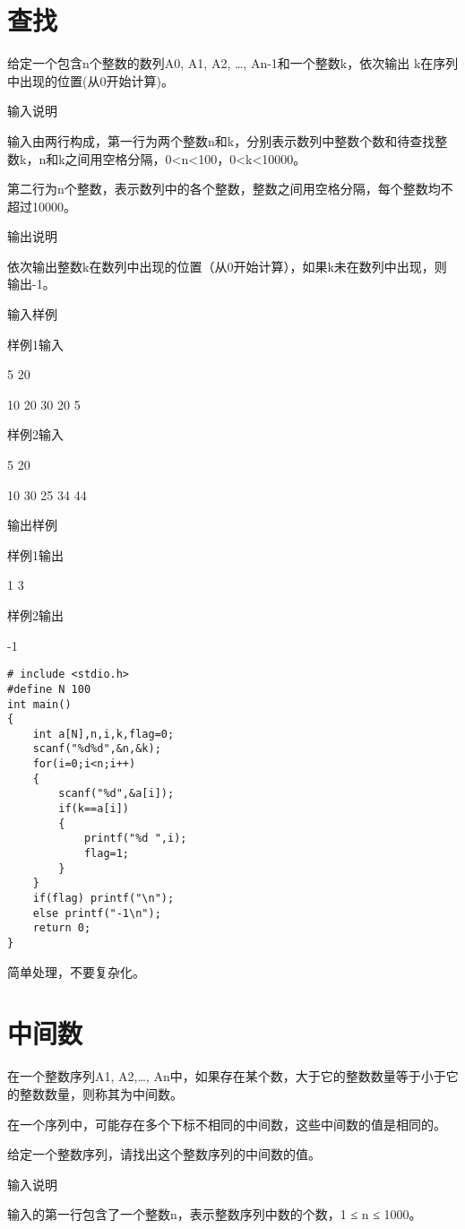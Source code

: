 \section{查找}	
给定一个包含n个整数的数列A0, A1, A2, \dots, An-1和一个整数k，依次输出 k在序列中出现的位置(从0开始计算)。

输入说明	

输入由两行构成，第一行为两个整数n和k，分别表示数列中整数个数和待查找整数k，n和k之间用空格分隔，0<n<100，0<k<10000。

第二行为n个整数，表示数列中的各个整数，整数之间用空格分隔，每个整数均不超过10000。

输出说明	

依次输出整数k在数列中出现的位置（从0开始计算），如果k未在数列中出现，则输出-1。

输入样例

样例1输入
	
5 20

10 20 30 20 5

样例2输入

5 20

10 30 25 34 44

输出样例
	
样例1输出

1 3

样例2输出

-1

\begin{lstlisting}
# include <stdio.h>
#define N 100
int main()
{
	int a[N],n,i,k,flag=0;
	scanf("%d%d",&n,&k);
	for(i=0;i<n;i++)
	{
		scanf("%d",&a[i]);
		if(k==a[i]) 
		{
			printf("%d ",i);
			flag=1;
		}
	} 
	if(flag) printf("\n");
	else printf("-1\n");
	return 0;
}
\end{lstlisting}

\begin{note}[要点]
	简单处理，不要复杂化。
\end{note}

\section{中间数}
在一个整数序列A1, A2,\dots, An中，如果存在某个数，大于它的整数数量等于小于它的整数数量，则称其为中间数。

在一个序列中，可能存在多个下标不相同的中间数，这些中间数的值是相同的。 

给定一个整数序列，请找出这个整数序列的中间数的值。 

输入说明

输入的第一行包含了一个整数n，表示整数序列中数的个数，1 ≤ n ≤ 1000。
 
